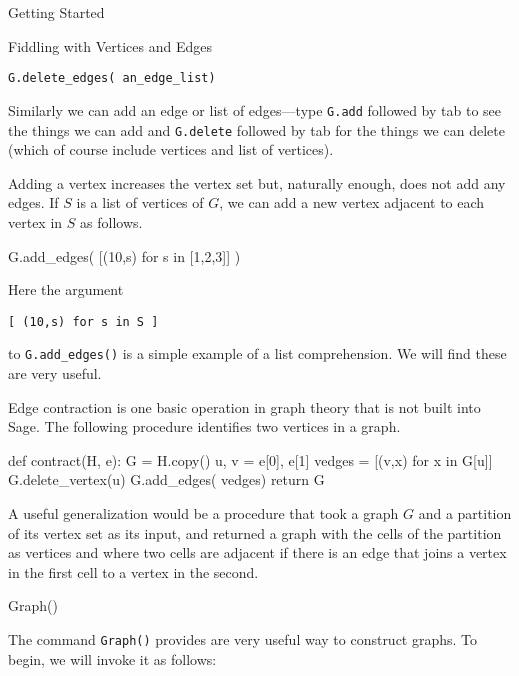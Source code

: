 \begin{chap}{Getting Started}
\begin{sect}{Fiddling with Vertices and Edges}
\begin{verbatim}
G.delete_edges( an_edge_list)
\end{verbatim}
%
\begin{para}
Similarly we can add an edge or list of edges---type \verb|G.add|
followed by tab to see the things we can add and \verb|G.delete|
followed by tab for the things we can delete (which of course include
vertices and list of vertices).
\end{para}
%
\begin{para}
Adding a vertex increases the vertex set but, naturally enough, does
not add any edges.
If $S$ is a list of vertices of $G$, we can add a new vertex adjacent to 
each vertex in $S$ as follows.
\end{para}
%
\begin{sageblock}
    G.add_edges( [(10,s) for s in [1,2,3]] )
\end{sageblock}
%
\begin{para}
Here the argument 
\end{para}
%
\begin{verbatim}
[ (10,s) for s in S ]
\end{verbatim}
%
\begin{para}
to \verb|G.add_edges()| is a simple example of a list comprehension.  
We will find these are very useful.
\end{para}
%
\begin{para}
Edge contraction is one basic operation in graph theory that is not built 
into Sage.  The following procedure identifies two vertices in a graph.
\end{para}
%
\begin{sageblock} 
def contract(H, e):
    G = H.copy() 
    u, v = e[0], e[1]
    vedges = [(v,x) for x in G[u]]  
    G.delete_vertex(u)
    G.add_edges( vedges)
    return G
\end{sageblock}
%
\begin{para}
A useful generalization would be a procedure that took a graph $G$
and a partition of its vertex set as its input, and returned
a graph with the cells of the partition as vertices and where
two cells are adjacent if there is an edge that joins a vertex
in the first cell to a vertex in the second.
\end{para}
%
\end{sect}
%
\begin{sect}{Graph()}
%
\begin{para}
The command \verb|Graph()| provides are very useful way to construct graphs.
To begin, we will invoke it as follows:

\end{para}
\end{sect}
\end{chap}
